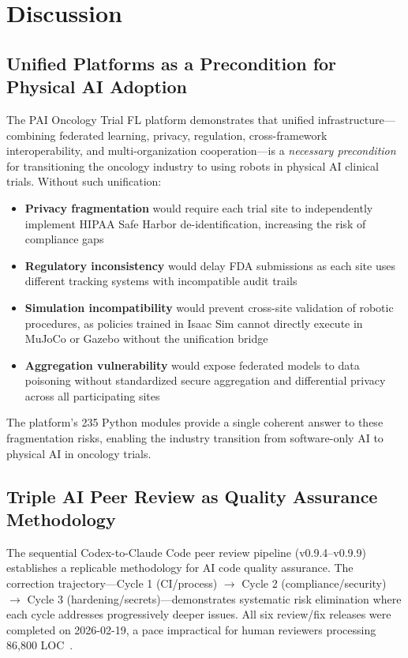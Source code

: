 \section{Discussion}
\label{sec:discussion}

\subsection{Unified Platforms as a Precondition for Physical AI Adoption}

The PAI Oncology Trial FL platform demonstrates that unified infrastructure---combining federated learning, privacy, regulation, cross-framework interoperability, and multi-organization cooperation---is a \emph{necessary precondition} for transitioning the oncology industry to using robots in physical AI clinical trials. Without such unification:
\begin{itemize}
  \item \textbf{Privacy fragmentation} would require each trial site to independently implement HIPAA Safe Harbor de-identification, increasing the risk of compliance gaps
  \item \textbf{Regulatory inconsistency} would delay FDA submissions as each site uses different tracking systems with incompatible audit trails
  \item \textbf{Simulation incompatibility} would prevent cross-site validation of robotic procedures, as policies trained in Isaac Sim cannot directly execute in MuJoCo or Gazebo without the unification bridge
  \item \textbf{Aggregation vulnerability} would expose federated models to data poisoning without standardized secure aggregation and differential privacy across all participating sites
\end{itemize}

The platform's 235 Python modules provide a single coherent answer to these fragmentation risks, enabling the industry transition from software-only AI to physical AI in oncology trials.

\subsection{Triple AI Peer Review as Quality Assurance Methodology}

The sequential Codex-to-Claude Code peer review pipeline (v0.9.4--v0.9.9) establishes a replicable methodology for AI code quality assurance. The correction trajectory---Cycle 1 (CI/process) $\to$ Cycle 2 (compliance/security) $\to$ Cycle 3 (hardening/secrets)---demonstrates systematic risk elimination where each cycle addresses progressively deeper issues. All six review/fix releases were completed on 2026-02-19, a pace impractical for human reviewers processing 86,800 LOC~\cite{kawchak2026peerreview}.

